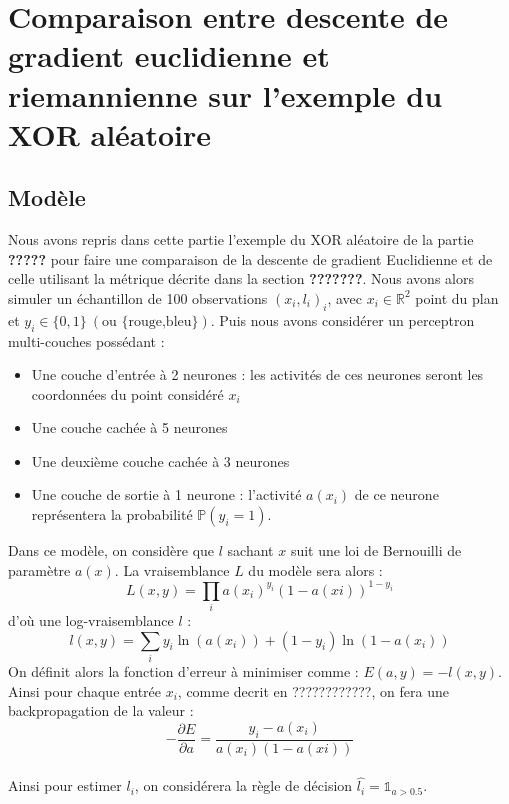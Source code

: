 \documentclass{article}
\theoremstyle{definition}
\begin{document}
\section{Comparaison entre descente de gradient euclidienne et riemannienne sur l'exemple du XOR aléatoire}
\subsection{Modèle}

Nous avons repris dans cette partie l'exemple du XOR aléatoire de la partie \textbf{?????} pour faire une comparaison de la descente de gradient Euclidienne et de celle utilisant la métrique décrite dans la section \textbf{???????}. Nous avons alors simuler un échantillon de 100 observations $(x_i,l_i)_i$, avec $x_i \in \mathbb{R}^2$ point du plan et $y_i\in\{0,1\}\ (\textrm{ou \{rouge,bleu\}})$. Puis nous avons considérer un perceptron multi-couches possédant :
\begin{itemize}
\item Une couche d'entrée à 2 neurones : les activités de ces neurones seront les coordonnées du point considéré $x_i$
\item Une couche cachée à 5 neurones
\item Une deuxième couche cachée à 3 neurones
\item Une couche de sortie à 1 neurone : l'activité $a(x_i)$ de ce neurone représentera la probabilité $\mathbb{P}(y_i=1)$.\\
\end{itemize}

Dans ce modèle, on considère que $l$ sachant $x$ suit une loi de Bernouilli de paramètre $a(x)$. La vraisemblance $L$ du modèle sera alors :
$$L(x,y)=\prod_i{a(x_i)^{y_i}(1-a(xi))^{1-y_i}}$$
d'où une log-vraisemblance $l$ :
$$l(x,y)=\sum_i{y_i\ln(a(x_i))+(1-y_i)\ln(1-a(x_i))}$$
On définit alors la fonction d'erreur à minimiser comme : $E(a,y)=-l(x,y)$.
Ainsi pour chaque entrée $x_i$, comme decrit en ????????????, on fera une backpropagation de la valeur :
$$-\frac{\partial E}{\partial a}=\frac{y_i-a(x_i)}{a(x_i)(1-a(xi))}$$\\


Ainsi pour estimer $l_i$, on considérera la règle de décision $\hat{l_i}=\mathds{1}_{a>0.5}$.\\
\end{document}
